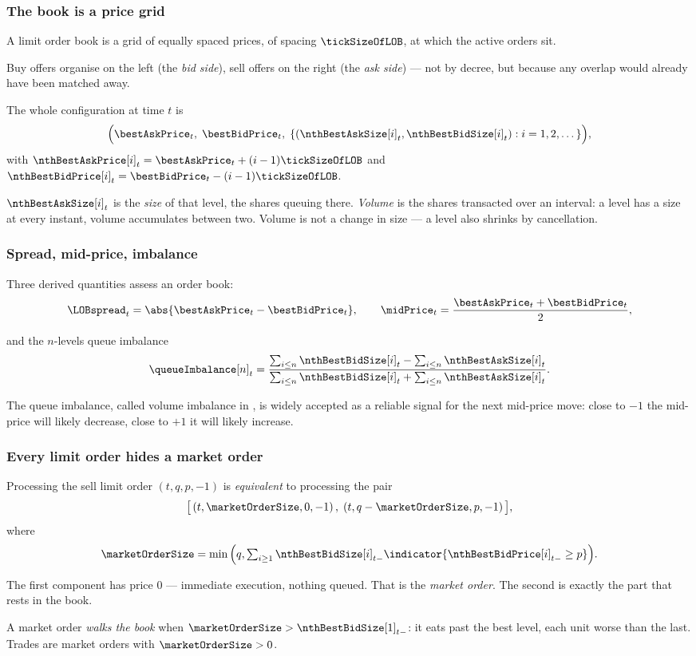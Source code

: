 \begin{frame}
  \frametitle{The book is a price grid}
A limit order book is a grid of equally spaced prices, of spacing $\tickSizeOfLOB$,
at which the active orders sit.

Buy offers organise on the left (the \emph{bid side}),
sell offers on the right (the \emph{ask side}) ---
not by decree, but because any overlap would already have been matched away.

The whole configuration at time $t$ is
\[
\Big(\bestAskPrice_t, \; \bestBidPrice_t, \;
\lbrace (\nthBestAskSize[i]_t, \nthBestBidSize[i]_t) : i=1,2,\dots \rbrace \Big),
\]
with $\nthBestAskPrice[i]_t = \bestAskPrice_t + (i-1)\tickSizeOfLOB$
and $\nthBestBidPrice[i]_t = \bestBidPrice_t - (i-1)\tickSizeOfLOB$.

$\nthBestAskSize[i]_t$ is the \emph{size} of that level, the shares queuing there.
\emph{Volume} is the shares transacted over an interval:
a level has a size at every instant, volume accumulates between two.
Volume is not a change in size --- a level also shrinks by cancellation.
\end{frame}

\begin{frame}
  \frametitle{Spread, mid-price, imbalance}
Three derived quantities assess an order book:
\[
\LOBspread_t = \abs{\bestAskPrice_t - \bestBidPrice_t},
\qquad
\midPrice_t = \frac{\bestAskPrice_t + \bestBidPrice_t}{2},
\]

and the $n$-levels queue imbalance
\[
\queueImbalance[n]_t =
\frac{\sum_{i\leq n}\nthBestBidSize[i]_t - \sum_{i\leq n}\nthBestAskSize[i]_t}{\sum_{i\leq n}\nthBestBidSize[i]_t + \sum_{i\leq n}\nthBestAskSize[i]_t}.
\]

The queue imbalance, called volume imbalance in \citet{CDJ18enh},
is widely accepted as a reliable signal for the next mid-price move:
close to $-1$ the mid-price will likely decrease, close to $+1$ it will likely increase.
\end{frame}

\begin{frame}
  \frametitle{Every limit order hides a market order}
Processing the sell limit order $(t,q,p,-1)$ is \emph{equivalent} to processing the pair
\[
\big[\,(t,\marketOrderSize,0,-1)\,,\;(t,q-\marketOrderSize,p,-1)\,\big],
\]
where
\[
\marketOrderSize = \min\Big(q, \textstyle\sum_{i\geq 1} \nthBestBidSize[i]_{t-} \indicator{\nthBestBidPrice[i]_{t-}\geq p}\Big).
\]

The first component has price $0$ --- immediate execution, nothing queued.
That is the \emph{market order}.
The second is exactly the part that rests in the book.

A market order \emph{walks the book} when $\marketOrderSize > \nthBestBidSize[1]_{t-}$:
it eats past the best level, each unit worse than the last.
Trades are market orders with $\marketOrderSize > 0$.
\end{frame}


